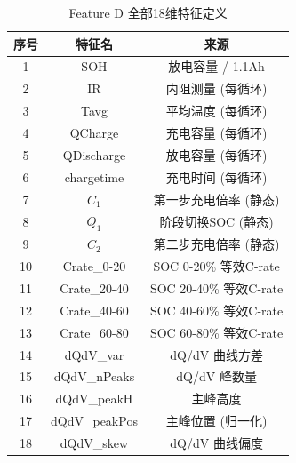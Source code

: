 \documentclass[12pt,a4paper]{ctexart}
\begin{document}
\begin{table}[H]
\centering
\caption{Feature D 全部18维特征定义}
\label{tab:feature_list}
\begin{tabularx}{\textwidth}{cCC}
\toprule
\textbf{序号} & \textbf{特征名} & \textbf{来源} \\
  & SOH            & 放电容量 / 1.1Ah \\
2  & IR             & 内阻测量 (每循环) \\
3  & Tavg           & 平均温度 (每循环) \\
4  & QCharge        & 充电容量 (每循环) \\
5  & QDischarge     & 放电容量 (每循环) \\
6  & chargetime     & 充电时间 (每循环) \\
7  & $C_1$          & 第一步充电倍率 (静态) \\
8  & $Q_1$          & 阶段切换SOC (静态) \\
9  & $C_2$          & 第二步充电倍率 (静态) \\
10 & Crate\_0-20    & SOC 0-20\% 等效C-rate \\
11 & Crate\_20-40   & SOC 20-40\% 等效C-rate \\
12 & Crate\_40-60   & SOC 40-60\% 等效C-rate \\
13 & Crate\_60-80   & SOC 60-80\% 等效C-rate \\
14 & dQdV\_var      & dQ/dV 曲线方差 \\
15 & dQdV\_nPeaks   & dQ/dV 峰数量 \\
16 & dQdV\_peakH    & 主峰高度 \\
17 & dQdV\_peakPos  & 主峰位置 (归一化) \\
18 & dQdV\_skew     & dQ/dV 曲线偏度 \\
\bottomrule
\end{tabularx}
\end{table}
\end{document}
